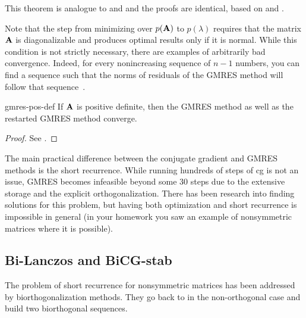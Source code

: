 \begin{remark}
  This theorem is analogue to  and
   and the proofs are
  identical, based on  and
  .

  Note that the step from minimizing over $p(\mathbf A)$ to $p(\lambda)$
  requires that the matrix $\mathbf A$ is diagonalizable and produces
  optimal results only if it is normal. While this condition is not
  strictly necessary, there are examples of arbitrarily bad
  convergence. Indeed, for every nonincreasing sequence of $n-1$
  numbers, you can find a sequence such that the norms of residuals of
  the GMRES method will follow that
  sequence~\cite{GreenbaumPtakStrakos96}.
\end{remark}

\begin{Theorem}{gmres-pos-def}
  If $\mathbf A$ is positive definite, then the GMRES method as well as
  the restarted GMRES method converge.
\end{Theorem}

\begin{proof}
  See \cite[Theorem 6.30]{Saad00}.
\end{proof}

\begin{remark}
  The main practical difference between the conjugate gradient and
  GMRES methods is the short recurrence. While running hundreds of
  steps of cg is not an issue, GMRES becomes infeasible beyond some 30
  steps due to the extensive storage and the explicit
  orthogonalization. There has been research into finding solutions
  for this problem, but having both optimization and short recurrence
  is impossible in general (in your homework you saw an example of
  nonsymmetric matrices where it is possible).
\end{remark}

\subsection{Bi-Lanczos and BiCG-stab}

\begin{intro}
  The problem of short recurrence for nonsymmetric matrices has been
  addressed by biorthogonalization methods. They go back to
   in the non-orthogonal case and
  build two biorthogonal sequences.
\end{intro}

